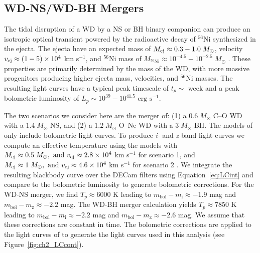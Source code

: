 \subsection{WD-NS/WD-BH Mergers}
\label{sec:ch2_WDmerge}
The tidal disruption of a WD by a NS or BH binary companion can produce an isotropic optical transient powered by the radioactive decay of ${}^{56}$Ni synthesized in the ejecta. The ejecta have an expected mass of $M_{\rm ej} \approx 0.3-1.0 \; M_{\odot}$, velocity $v_{\rm ej} \approx (1-5) \times 10^4$ km s$^{-1}$, and $^{56}$Ni mass of $M_{\text{$^{56}$Ni}} \approx 10^{-4.5} - 10^{-2.5}\;M_{\odot}$ \citep{Metzger2012}. These properties are primarily determined by the mass of the WD, with more massive progenitors producing higher ejecta mass, velocities, and $^{56}$Ni masses. The resulting light curves have a typical peak timescale of $t_p \sim $ week and a peak bolometric luminosity of $L_p \sim 10^{39} - 10^{41.5} \text{ erg s}^{-1}$.

The two scenarios we consider here are the merger of: (1) a $0.6\;M_{\odot}$ C--O WD with a $1.4\;M_{\odot}$ NS, and (2) a $1.2\;M_{\odot}$ O--Ne WD with a $3\;M_{\odot}$ BH. The models of \citet{Metzger2012} only include bolometric light curves. To produce {\em i}- and {\em z}-band light curves we compute an effective temperature using the  models with $M_{\rm ej} \approx 0.5\;M_{\odot},\text{ and }v_{\rm ej} \approx 2.8\times10^4$ km s$^{-1}$ for scenario 1, and $M_{\rm ej} \approx 1\;M_{\odot},\text{ and } v_{\rm ej} \approx 4.6\times10^4$ km s$^{-1}$ for scenario 2 \citep[see Figure 7 of][]{Metzger2012}. We integrate the resulting blackbody curve over the DECam filters using Equation~\ref{eq:LCint} and compare to the bolometric luminosity to generate bolometric corrections. For the WD-NS merger, we find $T_p \approx 6000$ K leading to $m_{\text{bol}} - m_{\text{i}} \approx -1.9$ mag and $m_{\text{bol}} - m_{\text{z}} \approx -2.2$ mag. The WD-BH merger calculation yields $T_p \approx 7850$ K leading to $m_{\text{bol}} - m_{\text{i}} \approx -2.2$ mag and $m_{\text{bol}} - m_{\text{z}} \approx -2.6$ mag. We assume that these corrections are constant in time. The bolometric corrections are applied to the light curves of \citet{Metzger2012} to generate the light curves used in this analysis (see Figure~\ref{fig:ch2_LCcont}).

